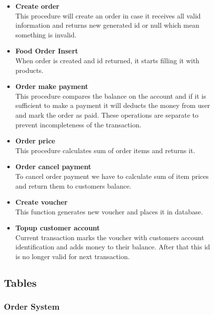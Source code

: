 \begin{figure}
\begin{itemize}
\item \textbf{Create order}
\\
This procedure will create an order in case it receives all valid information and returns new generated id or null which mean something is invalid.

\item \textbf{Food Order  Insert}
\\
When order is created and id returned, it starts filling it with products. 

\item \textbf{Order make payment}
\\
This procedure compares the balance on the account and if it is sufficient to make a payment it will deducts the money from user and mark the order as paid. These operations are separate to prevent incompleteness of the transaction. 

\item \textbf{Order price}
\\
This procedure calculates sum of order items and returns it.

\item \textbf{Order cancel payment}
\\
To cancel order payment we have to calculate sum of item prices and return them to customers balance.

\item \textbf{Create voucher}
\\
This function generates new voucher and places it in database.

\item \textbf{Topup customer account}
\\
Current transaction marks the voucher with customers account identification and adds money to their balance. After that this id is no longer valid for next transaction.


\end{itemize}
 
    \subsection{Tables}
    
    \subsubsection{Order System}
	    

\end{figure}
